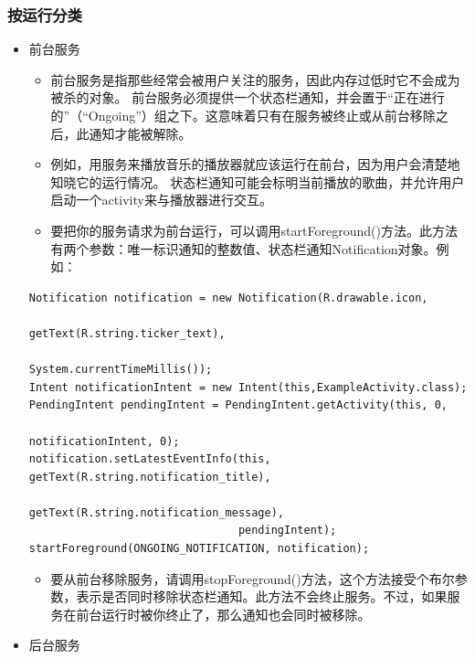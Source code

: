 \documentclass[9pt, b5paper]{article}
\begin{document}
\subsubsection{按运行分类}
\label{sec-3-3-1}
\begin{itemize}
\item 前台服务
\begin{itemize}
\item 前台服务是指那些经常会被用户关注的服务，因此内存过低时它不会成为被杀的对象。 前台服务必须提供一个状态栏通知，并会置于“正在进行的”（“Ongoing”）组之下。这意味着只有在服务被终止或从前台移除之后，此通知才能被解除。
\item 例如，用服务来播放音乐的播放器就应该运行在前台，因为用户会清楚地知晓它的运行情况。 状态栏通知可能会标明当前播放的歌曲，并允许用户启动一个activity来与播放器进行交互。
\item 要把你的服务请求为前台运行，可以调用startForeground()方法。此方法有两个参数：唯一标识通知的整数值、状态栏通知Notification对象。例如：
\end{itemize}
\begin{verbatim}
Notification notification = new Notification(R.drawable.icon,
                                             getText(R.string.ticker_text),
                                             System.currentTimeMillis());
Intent notificationIntent = new Intent(this,ExampleActivity.class);
PendingIntent pendingIntent = PendingIntent.getActivity(this, 0,
                                                        notificationIntent, 0);
notification.setLatestEventInfo(this, getText(R.string.notification_title),
                                getText(R.string.notification_message),
                                pendingIntent);
startForeground(ONGOING_NOTIFICATION, notification);
\end{verbatim}
\begin{itemize}
\item 要从前台移除服务，请调用stopForeground()方法，这个方法接受个布尔参数，表示是否同时移除状态栏通知。此方法不会终止服务。不过，如果服务在前台运行时被你终止了，那么通知也会同时被移除。
\end{itemize}
\item 后台服务
\end{itemize}
\end{document}
